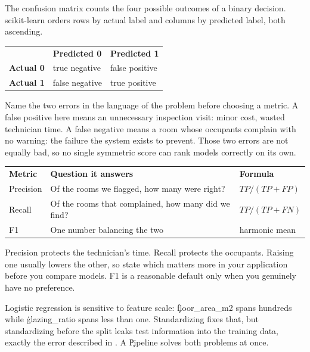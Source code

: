 
The confusion matrix counts the four possible outcomes of a binary decision.
scikit-learn orders rows by actual label and columns by predicted label, both
ascending.

\begin{center}
\begin{tabular}{lll}
 & \textbf{Predicted 0} & \textbf{Predicted 1} \\
\textbf{Actual 0} & true negative & false positive \\
\textbf{Actual 1} & false negative & true positive \\
\end{tabular}
\end{center}

Name the two errors in the language of the problem before choosing a metric. A
false positive here means an unnecessary inspection visit: minor cost, wasted
technician time. A false negative means a room whose occupants complain with no
warning: the failure the system exists to prevent. Those two errors are not
equally bad, so no single symmetric score can rank models correctly on its own.


\begin{center}
\begin{tabular}{lll}
\textbf{Metric} & \textbf{Question it answers} & \textbf{Formula} \\
Precision & Of the rooms we flagged, how many were right? & $TP / (TP + FP)$ \\
Recall & Of the rooms that complained, how many did we find? & $TP / (TP + FN)$ \\
F1 & One number balancing the two & harmonic mean \\
\end{tabular}
\end{center}

Precision protects the technician's time. Recall protects the occupants. Raising
one usually lowers the other, so state which matters more in your application
before you compare models. F1 is a reasonable default only when you genuinely
have no preference.


Logistic regression is sensitive to feature scale: \c{floor_area_m2} spans
hundreds while \c{glazing_ratio} spans less than one. Standardizing fixes that,
but standardizing before the split leaks test information into the training
data, exactly the error described in . A
\c{Pipeline} solves both problems at once.

